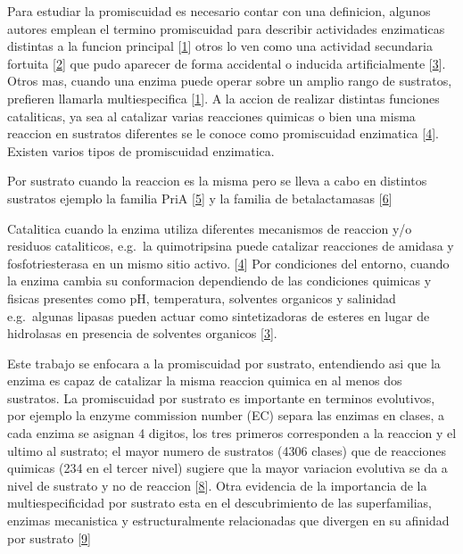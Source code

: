 \documentclass[12pt,twoside]{reedthesis}
\begin{document}
  Para estudiar la promiscuidad es necesario contar con una definicion,
  algunos autores emplean el termino promiscuidad para describir
  actividades enzimaticas distintas a la funcion principal
  {[}\protect\hyperlink{ref-khersonsky_enzyme_2010}{1}{]} otros lo ven
  como una actividad secundaria fortuita
  {[}\protect\hyperlink{ref-copley_enzymes_2003}{2}{]} que pudo aparecer
  de forma accidental o inducida artificialmente
  {[}\protect\hyperlink{ref-hult_enzyme_2007}{3}{]}. Otros mas, cuando una
  enzima puede operar sobre un amplio rango de sustratos, prefieren
  llamarla multiespecifica
  {[}\protect\hyperlink{ref-khersonsky_enzyme_2010}{1}{]}. A la accion de
  realizar distintas funciones cataliticas, ya sea al catalizar varias
  reacciones quimicas o bien una misma reaccion en sustratos diferentes se
  le conoce como promiscuidad enzimatica
  {[}\protect\hyperlink{ref-obrien_catalytic_1999}{4}{]}. Existen varios
  tipos de promiscuidad enzimatica.
  
  Por sustrato cuando la reaccion es la misma pero se lleva a cabo en
  distintos sustratos ejemplo la familia PriA
  {[}\protect\hyperlink{ref-baronagomez_occurrence_2003}{5}{]} y la
  familia de betalactamasas
  {[}\protect\hyperlink{ref-risso_phenotypic_2014}{6}{]}
  
  Catalitica cuando la enzima utiliza diferentes mecanismos de reaccion
  y/o residuos cataliticos, e.g.~la quimotripsina puede catalizar
  reacciones de amidasa y fosfotriesterasa en un mismo sitio activo.
  {[}\protect\hyperlink{ref-obrien_catalytic_1999}{4}{]} Por condiciones
  del entorno, cuando la enzima cambia su conformacion dependiendo de las
  condiciones quimicas y fisicas presentes como pH, temperatura, solventes
  organicos y salinidad e.g.~algunas lipasas pueden actuar como
  sintetizadoras de esteres en lugar de hidrolasas en presencia de
  solventes organicos {[}\protect\hyperlink{ref-hult_enzyme_2007}{3}{]}.
  
  Este trabajo se enfocara a la promiscuidad por sustrato, entendiendo asi
  que la enzima es capaz de catalizar la misma reaccion quimica en al
  menos dos sustratos. La promiscuidad por sustrato es importante en
  terminos evolutivos, por ejemplo la enzyme commission number (EC) separa
  las enzimas en clases, a cada enzima se asignan 4 digitos, los tres
  primeros corresponden a la reaccion y el ultimo al sustrato; el mayor
  numero de sustratos (4306 clases) que de reacciones quimicas (234 en el
  tercer nivel) sugiere que la mayor variacion evolutiva se da a nivel de
  sustrato y no de reaccion
  {[}\protect\hyperlink{ref-li_computational_2004}{8}{]}. Otra evidencia
  de la importancia de la multiespecificidad por sustrato esta en el
  descubrimiento de las superfamilias, enzimas mecanistica y
  estructuralmente relacionadas que divergen en su afinidad por sustrato
  {[}\protect\hyperlink{ref-glasner_evolution_2006}{9}{]}
  
\end{document}
